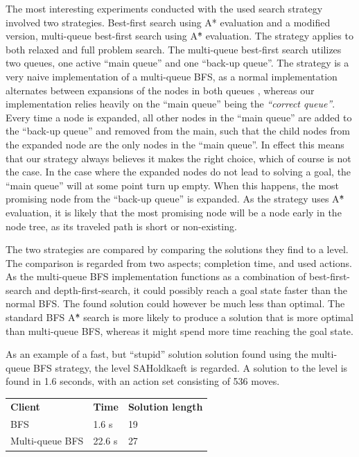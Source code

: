 \documentclass[Main]{subfiles}
\begin{document}

The most interesting experiments conducted with the used search strategy involved two strategies. Best-first search using A* evaluation and a modified version, multi-queue best-first search using A\^{*} evaluation. The strategy applies to both relaxed and full problem search. 
The multi-queue best-first search utilizes two queues, one active ``main queue'' and one ``back-up queue''. The strategy is a very naive implementation of a multi-queue BFS, as a normal implementation alternates between expansions of the nodes in both queues \citep{hector2013a}, whereas our implementation relies heavily on the ``main queue'' being the \textit{``correct queue''}. Every time a node is expanded, all other nodes in the ``main queue'' are added to the ``back-up queue'' and removed from the main, such that the child nodes from the expanded node are the only nodes in the ``main queue''. In effect this means that our strategy always believes it makes the right choice, which of course is not the case. In the case where the expanded nodes do not lead to solving a goal, the ``main queue'' will at some point turn up empty. When this happens, the most promising node from the ``back-up queue'' is expanded. As the strategy uses A\^{*} evaluation, it is likely that the most promising node will be a node early in the node tree, as its traveled path is short or non-existing. 

The two strategies are compared by comparing the solutions they find to a level. The comparison is regarded from two aspects; completion time, and used actions. As the multi-queue BFS implementation functions as a combination of best-first-search and depth-first-search, it could possibly reach a goal state faster than the normal BFS. The found solution could however be much less than optimal. The standard BFS A\^{*} search is more likely to produce a solution that is more optimal than multi-queue BFS, whereas it might spend more time reaching the goal state. 

As an example of a fast, but ``stupid'' solution solution found using the multi-queue BFS strategy, the level SAHoldkaeft is regarded. A solution to the level is found in 1.6 seconds, with an action set consisting of 536 moves. 

\begin{table}[h]
\begin{tabular}{lll}
\rowcolor{grayish}
\textbf{Client} & \textbf{Time} & \textbf{Solution length} \\   %
BFS             & 1.6 s        & 19                       \\    %
Multi-queue BFS & 22.6 s       & 27                       %
\end{tabular}
\end{table}
\end{document}
